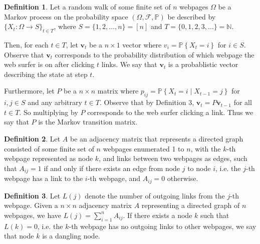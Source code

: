 \documentclass[11pt]{article}
\theoremstyle{definition}
\newtheorem{definition}{Definition}
\newcommand{\N}{\mathbb{N}}
\newcommand{\p}[1]{\mathbb{P}\left\{#1\right\}}
\renewcommand{\vec}[1]{\mathbf{#1}}
\begin{document}
\begin{definition}
    Let a random walk of some finite set of $n$ webpages $\Omega$ be a Markov process on the probability space $(\Omega, \mathcal{F}, \mathbb{P})$
    be described by $\{X_t : \Omega \to S\}_{t \in T}$, where $S = \{1, 2, \ldots, n\} = [n]$ and $T = \{0, 1, 2, 3, \ldots\} = \N$.
    
    Then, for each $t \in T$, let $\vec{v}_t$ be a $n \times 1$ vector
    where $v_i = \p{X_t = i}$ for $i \in S$.
    Observe that $\vec{v}_t$ corresponds to the probability distribution of which webpage the web surfer is on after clicking $t$ links.
    We say that $\vec{v}_t$ is a probablistic vector describing the state at step $t$.

    Furthermore, let $P$ be a $n \times n$ matrix
    where $p_{ij} = \p{X_t = i \mid X_{t-1} = j}$ for $i, j \in S$ and any arbitrary $t \in T$. Observe that by Definition 3, $\vec{v}_t = P \vec{v}_{t-1}$ for all $t \in T$.
    So multiplying by $P$ corresponds to the web surfer clicking a link.
    Thus we say that $P$ is the Markov transition matrix.
\end{definition}

\begin{definition}
    Let $A$ be an adjacency matrix that represents a directed graph consisted of some finite set of $n$ webpages enumerated 1 to $n$,
    with the $k$-th webpage represented as node $k$, and links between two webpages as edges,
    such that $A_{ij} = 1$ if and only if there exists an edge from node $j$ to node $i$, i.e. the $j$-th webpage has a link to the $i$-th webpage, and $A_{ij} = 0$ otherwise.
\end{definition}

\begin{definition}
    Let $L(j)$ denote the number of outgoing links from the $j$-th webpage.
    Given a $n \times n$ adjacency matrix $A$ representing a directed graph of $n$ webpages, 
    we have $L(j) = \sum_{i = 1}^n A_{ij}$.
    If there exists a node $k$ such that $L(k) = 0$, i.e. the $k$-th webpage has no outgoing links to other webpages, we say that node $k$ is a dangling node.
\end{definition}
\end{document}
